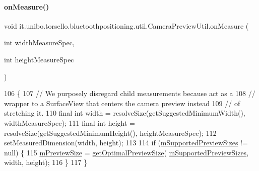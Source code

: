 \paragraph{\texorpdfstring{on\+Measure()}{onMeasure()}}
{\footnotesize\ttfamily void it.\+unibo.\+torsello.\+bluetoothpositioning.\+util.\+Camera\+Preview\+Util.\+on\+Measure (\begin{DoxyParamCaption}\item[{int}]{width\+Measure\+Spec,  }\item[{int}]{height\+Measure\+Spec }\end{DoxyParamCaption})\hspace{0.3cm}{\ttfamily [protected]}}


\begin{DoxyCode}
106                                                                           \{
107         \textcolor{comment}{// We purposely disregard child measurements because act as a}
108         \textcolor{comment}{// wrapper to a SurfaceView that centers the camera preview instead}
109         \textcolor{comment}{// of stretching it.}
110         \textcolor{keyword}{final} \textcolor{keywordtype}{int} width = resolveSize(getSuggestedMinimumWidth(), widthMeasureSpec);
111         \textcolor{keyword}{final} \textcolor{keywordtype}{int} height = resolveSize(getSuggestedMinimumHeight(), heightMeasureSpec);
112         setMeasuredDimension(width, height);
113 
114         \textcolor{keywordflow}{if} (\hyperlink{classit_1_1unibo_1_1torsello_1_1bluetoothpositioning_1_1util_1_1CameraPreviewUtil_a4aeb809017d527738a2b2be1ebe2cb39_a4aeb809017d527738a2b2be1ebe2cb39}{mSupportedPreviewSizes} != null) \{
115             \hyperlink{classit_1_1unibo_1_1torsello_1_1bluetoothpositioning_1_1util_1_1CameraPreviewUtil_a48550a4bc1d9358ae5de55f1109a2966_a48550a4bc1d9358ae5de55f1109a2966}{mPreviewSize} = \hyperlink{classit_1_1unibo_1_1torsello_1_1bluetoothpositioning_1_1util_1_1CameraPreviewUtil_ac7a729182a7e912d771f587f89a2ce03_ac7a729182a7e912d771f587f89a2ce03}{getOptimalPreviewSize}(
      \hyperlink{classit_1_1unibo_1_1torsello_1_1bluetoothpositioning_1_1util_1_1CameraPreviewUtil_a4aeb809017d527738a2b2be1ebe2cb39_a4aeb809017d527738a2b2be1ebe2cb39}{mSupportedPreviewSizes}, width, height);
116         \}
117     \}
\end{DoxyCode}
\hypertarget{classit_1_1unibo_1_1torsello_1_1bluetoothpositioning_1_1util_1_1CameraPreviewUtil_a69da006b39dff168a1cd185c5aa886f8_a69da006b39dff168a1cd185c5aa886f8}{}\label{classit_1_1unibo_1_1torsello_1_1bluetoothpositioning_1_1util_1_1CameraPreviewUtil_a69da006b39dff168a1cd185c5aa886f8_a69da006b39dff168a1cd185c5aa886f8} 
